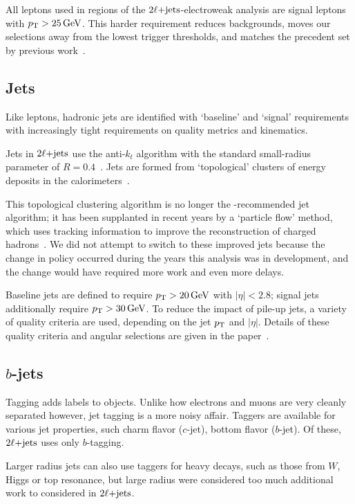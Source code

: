 All leptons used in regions of the $\twoljets$-electroweak analysis are signal
leptons with $\pt > 25\,\eV[G]$.
This harder requirement reduces backgrounds, moves our selections away from the
lowest trigger thresholds, and matches the precedent set by previous
work~\cite{atlas_23l_SUSY_2016_24}.


\subsection{Jets}
Like leptons, hadronic jets are identified with `baseline' and `signal'
requirements with increasingly tight requirements on quality metrics and
kinematics.

Jets in $\twoljets$ use the anti-$k_t$ algorithm with the standard small-radius
parameter of $R=0.4$~\cite{jet_anti_kt}.
Jets are formed from `topological' clusters of energy deposits in the
calorimeters~\cite{atlas_jet_topo_PERF_2014_07}.

This topological clustering algorithm is no longer the \atlas-recommended jet
algorithm; it has been supplanted in recent years by a `particle flow' method,
which uses tracking information to improve the reconstruction of charged
hadrons~\cite{atlas_jet_pflow_PERF_2015_09}.
We did not attempt to switch to these improved jets because the change in
policy occurred during the years this analysis was in development, and the
change would have required more work and even more delays.

Baseline jets are defined to require $\pt > 20\,\eV[G]$ with $|\eta| < 2.8$;
signal jets additionally require $\pt > 30\,\eV[G]$.
To reduce the impact of pile-up jets, a variety of quality criteria are used,
depending on the jet $\pt$ and $|\eta|$.
Details of these quality criteria and angular selections are given in the
paper~\cite{atlas2022searches}.


\subsection{$b$-jets}
\label{sec:2ljets_btagging}
Tagging adds labels to objects.
Unlike how electrons and muons are very cleanly separated however, jet tagging
is a more noisy affair.
Taggers are available for various jet properties, such charm flavor ($c$-jet),
bottom flavor ($b$-jet).
Of these, $\twoljets$ uses only $b$-tagging.

Larger radius jets can also use taggers for heavy decays, such as those from
$W$, Higgs or top resonance, but large radius were considered too much
additional work to considered in $\twoljets$.

